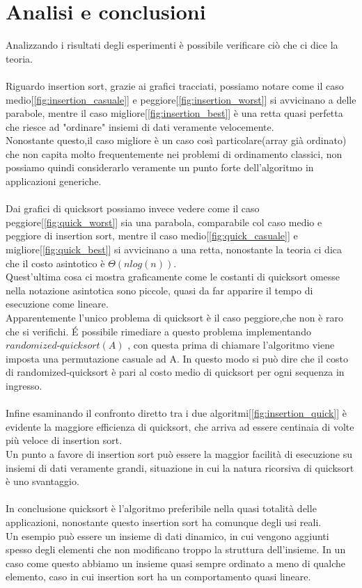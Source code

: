 \documentclass[]{article}
\begin{document}
\section{Analisi e conclusioni}
Analizzando i risultati degli esperimenti è possibile verificare ciò che ci dice la teoria.\\\\
Riguardo insertion sort, grazie ai grafici tracciati, possiamo notare come il caso medio[\ref{fig:insertion_casuale}] e peggiore[\ref{fig:insertion_worst}] si avvicinano a delle parabole, mentre il caso migliore[\ref{fig:insertion_best}] è una retta quasi perfetta che riesce ad "ordinare" insiemi di dati veramente velocemente.\\
Nonostante questo,il caso migliore è un caso così particolare(array già ordinato) che non capita molto frequentemente nei problemi di ordinamento classici, non possiamo quindi considerarlo veramente un punto forte dell'algoritmo in applicazioni generiche.\\\\
Dai grafici di quicksort possiamo invece vedere come il caso peggiore[\ref{fig:quick_worst}] sia una parabola, comparabile col caso medio e peggiore di insertion sort, mentre il caso medio[\ref{fig:quick_casuale}] e migliore[\ref{fig:quick_best}] si avvicinano a una retta, nonostante la teoria ci dica che il costo asintotico è $\Theta(nlog(n))$.\\
Quest'ultima cosa ci mostra graficamente come le costanti di quicksort omesse nella notazione asintotica sono piccole, quasi da far apparire il tempo di esecuzione come lineare.\\
Apparentemente l'unico problema di quicksort è il caso peggiore,che non è raro che si verifichi. \'E possibile rimediare a questo problema implementando $randomized\mbox{-}quicksort(A)$ , con questa prima di chiamare l'algoritmo viene imposta una permutazione casuale ad A. In questo modo si può dire che il costo di randomized-quicksort è pari al costo medio di quicksort per ogni sequenza in ingresso.\\\\
Infine esaminando il confronto diretto tra i due algoritmi[\ref{fig:insertion_quick}] è evidente la maggiore efficienza di quicksort, che arriva ad essere centinaia di volte più veloce di insertion sort.\\
Un punto a favore di insertion sort può essere la maggior facilità di esecuzione su insiemi di dati veramente grandi, situazione in cui la natura ricorsiva di quicksort è uno svantaggio.\\\\
In conclusione quicksort è l'algoritmo preferibile nella quasi totalità delle applicazioni, nonostante questo insertion sort ha comunque degli usi reali.\\
Un esempio può essere un insieme di dati dinamico, in cui vengono aggiunti spesso degli elementi che non modificano troppo la struttura dell'insieme. In un caso come questo abbiamo un insieme quasi sempre ordinato a meno di qualche elemento, caso in cui insertion sort ha un comportamento quasi lineare.
\end{document}
